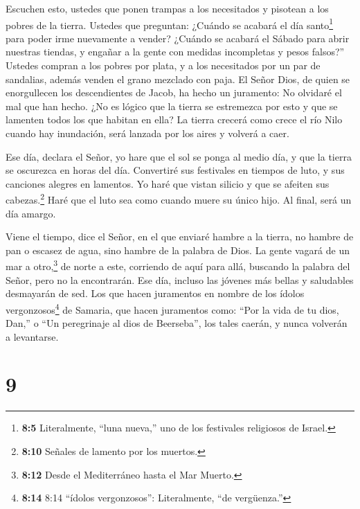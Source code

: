  Escuchen esto, ustedes que ponen trampas a los necesitados
y pisotean a los pobres de la tierra.  Ustedes que
preguntan: ¿Cuándo se acabará el día santo\footnote{\textbf{8:5}
  Literalmente, ``luna nueva,'' uno de los festivales religiosos de
  Israel.} para poder irme nuevamente a vender? ¿Cuándo se acabará el
Sábado para abrir nuestras tiendas, y engañar a la gente con medidas
incompletas y pesos falsos?''  Ustedes compran a los pobres
por plata, y a los necesitados por un par de sandalias, además venden el
grano mezclado con paja.  El Señor Dios, de quien se
enorgullecen los descendientes de Jacob, ha hecho un juramento: No
olvidaré el mal que han hecho.  ¿No es lógico que la tierra
se estremezca por esto y que se lamenten todos los que habitan en ella?
La tierra crecerá como crece el río Nilo cuando hay inundación, será
lanzada por los aires y volverá a caer.

 Ese día, declara el Señor, yo hare que el sol se ponga al
medio día, y que la tierra se oscurezca en horas del día. 
Convertiré sus festivales en tiempos de luto, y sus canciones alegres en
lamentos. Yo haré que vistan silicio y que se afeiten sus
cabezas.\footnote{\textbf{8:10} Señales de lamento por los muertos.}
Haré que el luto sea como cuando muere su único hijo. Al final, será un
día amargo.

 Viene el tiempo, dice el Señor, en el que enviaré hambre a
la tierra, no hambre de pan o escasez de agua, sino hambre de la palabra
de Dios.  La gente vagará de un mar a otro,\footnote{\textbf{8:12}
  Desde el Mediterráneo hasta el Mar Muerto.} de norte a este, corriendo
de aquí para allá, buscando la palabra del Señor, pero no la
encontrarán.  Ese día, incluso las jóvenes más bellas y
saludables desmayarán de sed.  Los que hacen juramentos en
nombre de los ídolos vergonzosos\footnote{\textbf{8:14} 8:14 ``ídolos
  vergonzosos'': Literalmente, ``de vergüenza.''} de Samaria, que hacen
juramentos como: ``Por la vida de tu dios, Dan,'' o ``Un peregrinaje al
dios de Beerseba'', los tales caerán, y nunca volverán a levantarse.

\hypertarget{section-8}{%
\section{9}\label{section-8}}

